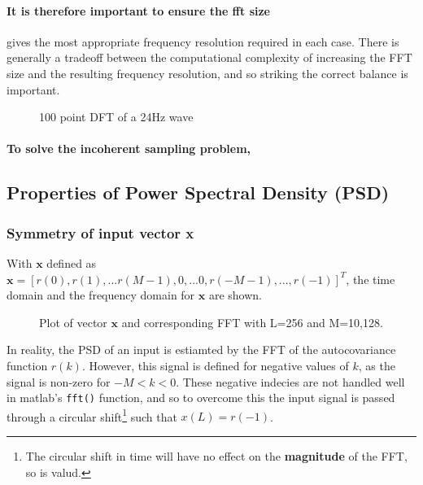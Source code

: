 \documentclass[main.tex]{subfiles}
\begin{document}
\paragraph{It is therefore important to ensure the fft size} gives the most appropriate frequency resolution required in each case. There is generally a tradeoff between the computational complexity of increasing the FFT size and the resulting frequency resolution, and so striking the correct balance is important.

\begin{figure}[H]
	\centering 
	\resizebox{0.7\textwidth}{!}{}
	\caption{100 point DFT of a 24Hz wave}
	\label{fig:q1_1_c}
\end{figure}


\paragraph{To solve the incoherent sampling problem,} %




















\subsection{Properties of Power Spectral Density (PSD)}


\subsubsection{Symmetry of input vector x}

With $\textbf{x}$ defined as $\textbf{x} = [r(0), r(1),...r(M-1),0,...0,r(-M-1),...,r(-1)]^T$, the time domain and the frequency domain for $\textbf{x}$ are shown. 

\begin{figure}[H]
	\centering 
	\resizebox{\textwidth}{!}{}
	\caption{Plot of vector $\textbf{x}$ and corresponding FFT with L=256 and M=10,128.}
	\label{fig:q1_2_a}
\end{figure}


In reality, the PSD of an input is estiamted by the FFT of the autocovariance function $r(k)$. However, this signal is defined for negative values of $k$, as the signal is non-zero for $-M < k < 0$. These negative indecies are not handled well in matlab's {\tt fft()} function, and so to overcome this the input signal is passed through a circular shift\footnote{The circular shift in time will have no effect on the \textbf{magnitude} of the FFT, so is valud.} such that $x(L) = r(-1)$.
\end{document}
